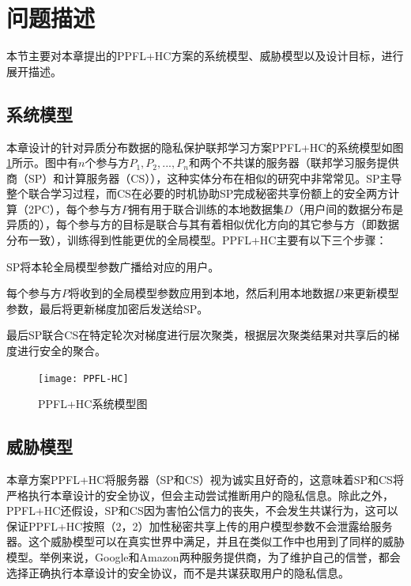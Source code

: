 \section{问题描述}\label{4-problem}
本节主要对本章提出的PPFL+HC方案的系统模型、威胁模型以及设计目标，进行展开描述。

\subsection{系统模型}
本章设计的针对异质分布数据的隐私保护联邦学习方案PPFL+HC的系统模型如图\ref{sysjpg}所示。图中有$n$个参与方$P_1,P_2,...,P_n$和两个不共谋的服务器（联邦学习服务提供商（SP）和计算服务器（CS）），这种实体分布在相似的研究\cite{liu2021privacy, dong2021flod, hao2021efficient}中非常常见。SP主导整个联合学习过程，而CS在必要的时机协助SP完成秘密共享份额上的安全两方计算（2PC），每个参与方$P$拥有用于联合训练的本地数据集$D$（用户间的数据分布是异质的），每个参与方的目标是联合与其有着相似优化方向的其它参与方（即数据分布一致），训练得到性能更优的全局模型。PPFL+HC主要有以下三个步骤：
\begin{compactenum}
    \item SP将本轮全局模型参数广播给对应的用户。
    \item 每个参与方$P$将收到的全局模型参数应用到本地，然后利用本地数据$D$来更新模型参数，最后将更新梯度加密后发送给SP。
    \item 最后SP联合CS在特定轮次对梯度进行层次聚类，根据层次聚类结果对共享后的梯度进行安全的聚合。
\end{compactenum}


\begin{figure}[htbp]
    \begin{center}
        \texttt{[image: PPFL-HC]}
        \caption{PPFL+HC系统模型图}
        \label{sysjpg}
    \end{center}
\end{figure}

\subsection{威胁模型}
本章方案PPFL+HC将服务器（SP和CS）视为诚实且好奇的，这意味着SP和CS将严格执行本章设计的安全协议，但会主动尝试推断用户的隐私信息。除此之外，PPFL+HC还假设，SP和CS因为害怕公信力的丧失，不会发生共谋行为，这可以保证PPFL+HC按照（2，2）加性秘密共享上传的用户模型参数不会泄露给服务器。这个威胁模型可以在真实世界中满足，并且在类似工作\cite{nguyen2022flame}中也用到了同样的威胁模型。举例来说，Google和Amazon两种服务提供商，为了维护自己的信誉，都会选择正确执行本章设计的安全协议，而不是共谋获取用户的隐私信息。

